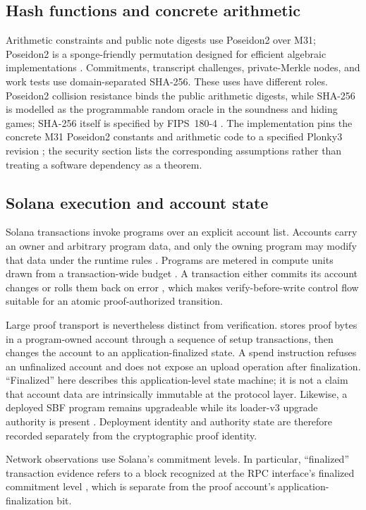 \subsection{Hash functions and concrete arithmetic}

Arithmetic constraints and public note digests use Poseidon2 over M31;
Poseidon2 is a sponge-friendly permutation designed for efficient algebraic
implementations \cite{GrassiKhovratovichSchofnegger2023}.  Commitments, transcript
challenges, private-Merkle nodes, and work tests use domain-separated SHA-256.
These uses have different roles.  Poseidon2 collision resistance binds the
public arithmetic digests, while SHA-256 is modelled as the programmable random
oracle in the soundness and hiding games; SHA-256 itself is specified by
FIPS~180-4 \cite{NISTFIPS1804}.  The implementation pins the
concrete M31 Poseidon2 constants and arithmetic code to a specified Plonky3
revision \cite{Plonky3M31Poseidon2Version061}; the security section lists the corresponding
assumptions rather than treating a software dependency as a theorem.

\subsection{Solana execution and account state}

Solana transactions invoke programs over an explicit account list.  Accounts
carry an owner and arbitrary program data, and only the owning program may
modify that data under the runtime rules \cite{SolanaAccounts}.  Programs are
metered in compute units drawn from a transaction-wide budget
\cite{SolanaComputeBudget}.  A transaction either commits its account changes or
rolls them back on error \cite{SolanaTransactions,SolanaTransactionPipeline},
which makes verify-before-write control flow suitable for an atomic
proof-authorized transition.

Large proof transport is nevertheless distinct from verification.  \Profile{}
stores proof bytes in a program-owned account through a sequence of setup
transactions, then changes the account to an application-finalized state.  A
spend instruction refuses an unfinalized account and does not expose an upload
operation after finalization.  ``Finalized'' here describes this
application-level state machine; it is not a claim that account data are
intrinsically immutable at the protocol layer.  Likewise, a deployed SBF
program remains upgradeable while its loader-v3 upgrade authority is present
\cite{SolanaProgramDeployment}.  Deployment identity and authority state are
therefore recorded separately from the cryptographic proof identity.

Network observations use Solana's commitment levels.  In particular,
``finalized'' transaction evidence refers to a block recognized at the RPC
interface's finalized commitment level \cite{SolanaRPC}, which is
separate from the proof account's application-finalization bit.
